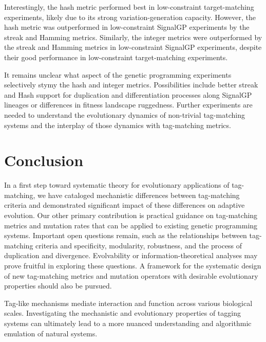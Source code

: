 Interestingly, the hash metric performed best in low-constraint target-matching experiments, likely due to its strong variation-generation capacity.
However, the hash metric was outperformed in low-constraint SignalGP experiments by the streak and Hamming metrics.
Similarly, the integer metrics were outperformed by the streak and Hamming metrics in low-constraint SignalGP experiments, despite their good performance in low-constraint target-matching experiments.

It remains unclear what aspect of the genetic programming experiments selectively stymy the hash and integer metrics.
Possibilities include better streak and Hash support for duplication and differentiation processes along SignalGP lineages or differences in fitness landscape ruggedness.
Further experiments are needed to understand the evolutionary dynamics of non-trivial tag-matching systems and the interplay of those dynamics with tag-matching metrics.

\section{Conclusion}

In a first step toward systematic theory for evolutionary applications of tag-matching, we have cataloged mechanistic differences between tag-matching criteria and demonstrated significant impact of these differences on adaptive evolution.
Our other primary contribution is practical guidance on tag-matching metrics and mutation rates that can be applied to existing genetic programming systems.
Important open questions remain, such as the relationships between tag-matching criteria and specificity, modularity, robustness, and the process of duplication and divergence.
Evolvability or information-theoretical analyses may prove fruitful in exploring these questions.
A framework for the systematic design of new tag-matching metrics and mutation operators with desirable evolutionary properties should also be pursued.

Tag-like mechanisms mediate interaction and function across various biological scales.
Investigating the mechanistic and evolutionary properties of tagging systems can ultimately lead to a more nuanced understanding and algorithmic emulation of natural systems.
